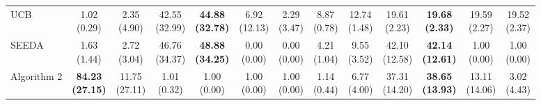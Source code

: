 {\begin{tabular}{l|cccccc|cccccc}
UCB & \makecell{1.02 \\ (0.29)} & \makecell{2.35 \\ (4.90)} & {\cellcolor[HTML]{C8E6C9}} \makecell{42.55 \\ (32.99)} & \bfseries \makecell{44.88 \\ (32.78)} & \makecell{6.92 \\ (12.13)} & \makecell{2.29 \\ (3.47)} & \makecell{8.87 \\ (0.78)} & \makecell{12.74 \\ (1.48)} & {\cellcolor[HTML]{C8E6C9}} \makecell{19.61 \\ (2.23)} & \bfseries \makecell{19.68 \\ (2.33)} & \makecell{19.59 \\ (2.27)} & \makecell{19.52 \\ (2.37)} \\
SEEDA & \makecell{1.63 \\ (1.44)} & \makecell{2.72 \\ (3.04)} & {\cellcolor[HTML]{C8E6C9}} \makecell{46.76 \\ (34.37)} & \bfseries \makecell{48.88 \\ (34.25)} & \makecell{0.00 \\ (0.00)} & \makecell{0.00 \\ (0.00)} & \makecell{4.21 \\ (1.04)} & \makecell{9.55 \\ (3.52)} & {\cellcolor[HTML]{C8E6C9}} \makecell{42.10 \\ (12.58)} & \bfseries \makecell{42.14 \\ (12.61)} & \makecell{1.00 \\ (0.00)} & \makecell{1.00 \\ (0.00)} \\
Algorithm 2 & \bfseries \makecell{84.23 \\ (27.15)} & \makecell{11.75 \\ (27.11)} & {\cellcolor[HTML]{C8E6C9}} \makecell{1.01 \\ (0.32)} & \makecell{1.00 \\ (0.00)} & \makecell{1.00 \\ (0.00)} & \makecell{1.00 \\ (0.00)} & \makecell{1.14 \\ (0.44)} & \makecell{6.77 \\ (4.00)} & {\cellcolor[HTML]{C8E6C9}} \makecell{37.31 \\ (14.20)} & \bfseries \makecell{38.65 \\ (13.93)} & \makecell{13.11 \\ (14.06)} & \makecell{3.02 \\ (4.43)} \\

\end{tabular}}
